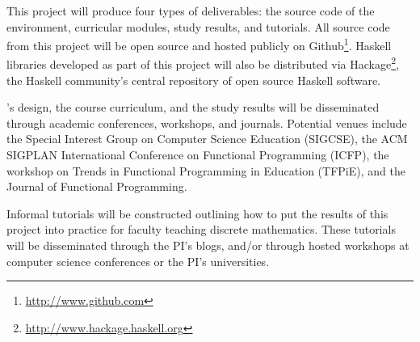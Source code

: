 This project will produce four types of deliverables: the source code
of the \thelang{} environment, curricular modules, study results, and
tutorials.  All source code from this project will be open source and
hosted publicly on Github\footnote{\url{http://www.github.com}}.
Haskell libraries developed as part of this project will also be
distributed via
Hackage\footnote{\url{http://www.hackage.haskell.org}}, the Haskell
community's central repository of open source Haskell software.

\thelang{}'s design, the course curriculum, and the study results
will be disseminated through academic conferences, workshops, and
journals.  Potential venues include the Special Interest Group on
Computer Science Education (SIGCSE), the ACM SIGPLAN International
Conference on Functional Programming (ICFP), the workshop on Trends in
Functional Programming in Education (TFPiE), and the Journal of
Functional Programming.

Informal tutorials will be constructed outlining how to put the
results of this project into practice for faculty teaching discrete
mathematics.  These tutorials will be disseminated through the PI's
blogs, and/or through hosted workshops at computer science conferences
or the PI's universities.
